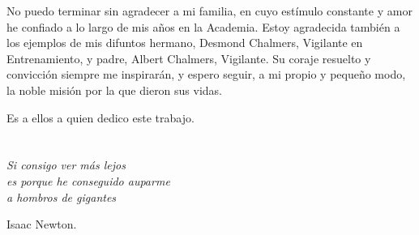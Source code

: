 No puedo terminar sin agradecer a mi familia, en cuyo estímulo constante y amor he confiado a lo largo de mis años en la Academia. Estoy agradecida también a los ejemplos de mis  difuntos hermano, Desmond Chalmers, Vigilante en Entrenamiento, y padre, Albert Chalmers, Vigilante. Su coraje resuelto y convicción siempre me inspirarán, y espero seguir, a mi propio y pequeño modo, la noble misión por la que dieron sus vidas. 

Es a ellos a quien dedico este trabajo.


\chapter*{}
\setlength{\leftmargin}{0.5\textwidth}
\setlength{\parsep}{0cm}
\addtolength{\topsep}{0.5cm}
\begin{flushright}
\small\em{
Si consigo ver más lejos\\
es porque he conseguido auparme\\ 
a hombros de gigantes
}
\end{flushright}
\begin{flushright}
\small{
Isaac Newton.
}
\end{flushright}
